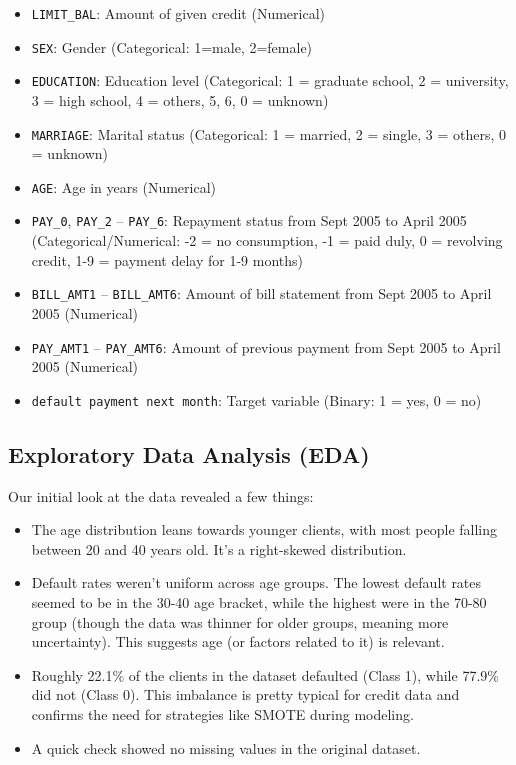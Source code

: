 \documentclass[a4paper,12pt]{article}
\begin{document}
\begin{itemize}
    \item \texttt{LIMIT\_BAL}: Amount of given credit (Numerical)
    \item \texttt{SEX}: Gender (Categorical: 1=male, 2=female)
    \item \texttt{EDUCATION}: Education level (Categorical: 1 = graduate school, 2 = university, 3 = high school, 4 = others, 5, 6, 0 = unknown)
    \item \texttt{MARRIAGE}: Marital status (Categorical: 1 = married, 2 = single, 3 = others, 0 = unknown)
    \item \texttt{AGE}: Age in years (Numerical)
    \item \texttt{PAY\_0}, \texttt{PAY\_2} -- \texttt{PAY\_6}: Repayment status from Sept 2005 to April 2005 (Categorical/Numerical: -2 = no consumption, -1 = paid duly, 0 = revolving credit, 1-9 = payment delay for 1-9 months)
    \item \texttt{BILL\_AMT1} -- \texttt{BILL\_AMT6}: Amount of bill statement from Sept 2005 to April 2005 (Numerical)
    \item \texttt{PAY\_AMT1} -- \texttt{PAY\_AMT6}: Amount of previous payment from Sept 2005 to April 2005 (Numerical)
    \item \texttt{default payment next month}: Target variable (Binary: 1 = yes, 0 = no)
\end{itemize}

\subsection{Exploratory Data Analysis (EDA)}

Our initial look at the data revealed a few things:

\begin{itemize}
    \item The age distribution leans towards younger clients, with most people falling between 20 and 40 years old. It's a right-skewed distribution.
    \item Default rates weren't uniform across age groups. The lowest default rates seemed to be in the 30-40 age bracket, while the highest were in the 70-80 group (though the data was thinner for older groups, meaning more uncertainty). This suggests age (or factors related to it) is relevant.
    \item Roughly 22.1\% of the clients in the dataset defaulted (Class 1), while 77.9\% did not (Class 0). This imbalance is pretty typical for credit data and confirms the need for strategies like SMOTE during modeling.
    \item A quick check showed no missing values in the original dataset.
\end{itemize}
\end{document}
